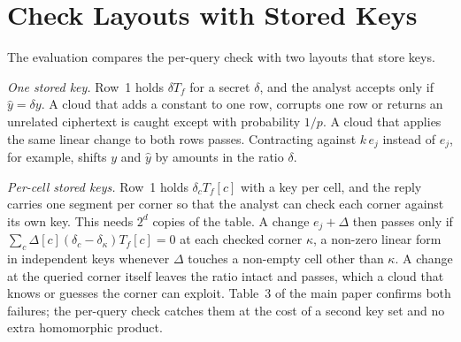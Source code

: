 \documentclass[10pt,journal,compsoc]{IEEEtran}
\begin{document}
\section{Check Layouts with Stored Keys}

The evaluation compares the per-query check with two layouts that store keys.

\emph{One stored key.} Row~1 holds $\delta T_f$ for a secret $\delta$, and
the analyst accepts only if $\hat y=\delta y$. A cloud that adds a constant to
one row, corrupts one row or returns an unrelated ciphertext is caught except
with probability $1/p$. A cloud that applies the same linear change to both
rows passes. Contracting against $k\,e_j$ instead of $e_j$, for example,
shifts $y$ and $\hat y$ by amounts in the ratio $\delta$.

\emph{Per-cell stored keys.} Row~1 holds $\delta_cT_f[c]$ with a key per
cell, and the reply carries one segment per corner so that the analyst can
check each corner against its own key. This needs $2^d$ copies of the table.
A change $e_j+\Delta$ then passes only if
$\sum_{c}\Delta[c](\delta_c-\delta_{\kappa})T_f[c]=0$ at each checked corner
$\kappa$, a non-zero linear form in independent keys whenever $\Delta$ touches
a non-empty cell other than $\kappa$. A change at the queried corner itself
leaves the ratio intact and passes, which a cloud that knows or guesses the
corner can exploit. Table~3 of the main paper confirms both failures; the
per-query check catches them at the cost of a second key set and no extra
homomorphic product.



\end{document}
